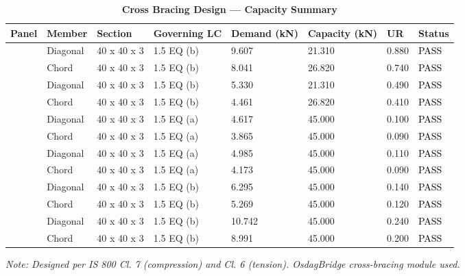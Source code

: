 \documentclass[12pt,a4paper]{report}
\numberwithin{table}{chapter}
\numberwithin{figure}{chapter}
\begin{document}
\vspace{1em}
\begin{longtable}{|C{2.0cm}|L{1.8cm}|C{2.2cm}|C{3.0cm}|C{1.8cm}|C{1.8cm}|C{1.2cm}|C{1.8cm}|}
\caption{\textbf{Cross Bracing Design --- Capacity Summary}}
\hline
\textbf{Panel} & \textbf{Member} & \textbf{Section} & \textbf{Governing LC} & \textbf{Demand (kN)} & \textbf{Capacity (kN)} & \textbf{UR} & \textbf{Status} \\[6pt]
\hline
{} & Diagonal & 40 x 40 x 3 & 1.5 EQ (b) & 9.607 & 21.310 & 0.880 & \textcolor{black}{PASS} \\[6pt]
 & Chord & 40 x 40 x 3 & 1.5 EQ (b) & 8.041 & 26.820 & 0.740 & \textcolor{black}{PASS} \\[6pt]
\hline
{} & Diagonal & 40 x 40 x 3 & 1.5 EQ (b) & 5.330 & 21.310 & 0.490 & \textcolor{black}{PASS} \\[6pt]
 & Chord & 40 x 40 x 3 & 1.5 EQ (b) & 4.461 & 26.820 & 0.410 & \textcolor{black}{PASS} \\[6pt]
\hline
{} & Diagonal & 40 x 40 x 3 & 1.5 EQ (a) & 4.617 & 45.000 & 0.100 & \textcolor{black}{PASS} \\[6pt]
 & Chord & 40 x 40 x 3 & 1.5 EQ (a) & 3.865 & 45.000 & 0.090 & \textcolor{black}{PASS} \\[6pt]
\hline
{} & Diagonal & 40 x 40 x 3 & 1.5 EQ (a) & 4.985 & 45.000 & 0.110 & \textcolor{black}{PASS} \\[6pt]
 & Chord & 40 x 40 x 3 & 1.5 EQ (a) & 4.173 & 45.000 & 0.090 & \textcolor{black}{PASS} \\[6pt]
\hline
{} & Diagonal & 40 x 40 x 3 & 1.5 EQ (b) & 6.295 & 45.000 & 0.140 & \textcolor{black}{PASS} \\[6pt]
 & Chord & 40 x 40 x 3 & 1.5 EQ (b) & 5.269 & 45.000 & 0.120 & \textcolor{black}{PASS} \\[6pt]
\hline
{} & Diagonal & 40 x 40 x 3 & 1.5 EQ (b) & 10.742 & 45.000 & 0.240 & \textcolor{black}{PASS} \\[6pt]
 & Chord & 40 x 40 x 3 & 1.5 EQ (b) & 8.991 & 45.000 & 0.200 & \textcolor{black}{PASS} \\[6pt]
\hline
\end{longtable}
\noindent\textit{Note: Designed per IS 800 Cl. 7 (compression) and Cl. 6 (tension). OsdagBridge cross-bracing module used.}
\end{document}
